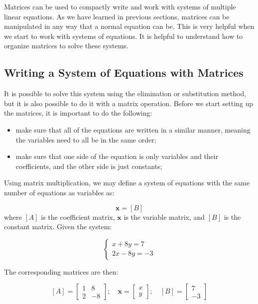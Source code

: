 Matrices can be used to compactly write and work with systems of
multiple linear equations. As we have learned in previous sections,
matrices can be manipulated in any way that a normal equation can be.
This is very helpful when we start to work with systems of equations. It
is helpful to understand how to organize matrices to solve these
systems.

\subsection{Writing a System of Equations with Matrices}\label{writing-a-system-of-equations-with-matrices}

It is possible to solve this system using the elimination or
substitution method, but it is also possible to do it with a matrix
operation. Before we start setting up the matrices, it is important to
do the following:

\begin{itemize}
\tightlist
\item
  make sure that all of the equations are written in a similar manner,
  meaning the variables need to all be in the same order;
\item
  make sure that one side of the equation is only variables and their
  coefficients, and the other side is just constants;
\end{itemize}

Using matrix multiplication, we may define a
system of equations with the same number of equations as variables as:

\begin{equation} 
[A]\mathbf{x} = [B]
\end{equation}
where \([A]\) is the coefficient matrix, \(\mathbf{x}\) is the variable matrix, and \([B]\) is the constant matrix. Given the system:

\[
\begin{cases}
x + 8y = 7 \\
2x -8y = -3
\end{cases}
\]

The corresponding matrices are then:

\[[A]=
\begin{bmatrix}
1 & 8\\
2 & -8
\end{bmatrix}
;\quad
\mathbf{x}=
\begin{bmatrix}
x\\
y
\end{bmatrix}
;\quad
[B]=
\begin{bmatrix}
7\\
-3
\end{bmatrix}
\]

